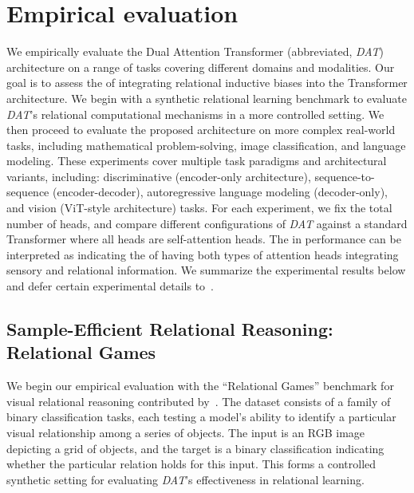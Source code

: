 \section{Empirical evaluation}\label{sec:experiments}

We empirically evaluate the Dual Attention Transformer (abbreviated, \textit{DAT}) architecture on a range of tasks covering different domains and modalities. Our goal is to assess the  of integrating relational inductive biases into the Transformer architecture. We begin with a synthetic relational learning benchmark to evaluate \textit{DAT}'s relational computational mechanisms in a more controlled setting. We then proceed to evaluate the proposed architecture on more complex real-world tasks, including mathematical problem-solving, image classification, and language modeling. These experiments cover multiple task paradigms and architectural variants, including: discriminative (encoder-only architecture), sequence-to-sequence (encoder-decoder), autoregressive language modeling (decoder-only), and vision (ViT-style architecture) tasks.
For each experiment, we fix the total number of heads, and compare different configurations of \textit{DAT} against a standard Transformer where all heads are self-attention heads. The  in performance can be interpreted as indicating the  of having both types of attention heads integrating sensory and relational information.
We summarize the experimental results below and defer certain experimental details to~.

\subsection{Sample-Efficient Relational Reasoning: Relational Games}\label{ssec:relgames}

We begin our empirical evaluation with the ``Relational Games'' benchmark for visual relational reasoning contributed by~\citet{shanahanExplicitlyRelationalNeurala}. The dataset consists of a family of binary classification tasks, each testing a model's ability to identify a particular visual relationship among a series of objects. The input is an RGB image depicting a grid of objects, and the target is a binary classification indicating whether the particular relation holds for this input. This forms a controlled synthetic setting for evaluating \textit{DAT}'s effectiveness in relational learning.

